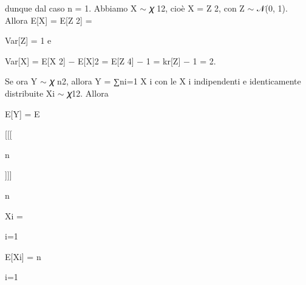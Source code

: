 \documentclass[a4paper,portrait,12pt]{article}
\begin{document}
\begin{flushleft}
dunque dal caso n = 1. Abbiamo X $\sim$ 𝜒 12, cio\`{e} X = Z 2, con Z $\sim$ 𝒩(0, 1). Allora E[X] = E[Z 2] =
\end{flushleft}


\begin{flushleft}
Var[Z] = 1 e
\end{flushleft}





\begin{flushleft}
Var[X] = E[X 2] $-$ E[X]2 = E[Z 4] $-$ 1 = kr[Z] $-$ 1 = 2.
\end{flushleft}


\begin{flushleft}
Se ora Y $\sim$ 𝜒 n2, allora Y = ∑ni=1 X i con le X i indipendenti e identicamente distribuite Xi $\sim$ 𝜒12. Allora
\end{flushleft}


\begin{flushleft}
E[Y] = E
\end{flushleft}





[[[





\begin{flushleft}
n
\end{flushleft}





]]]





\begin{flushleft}
n
\end{flushleft}





\begin{flushleft}
Xi =
\end{flushleft}


\begin{flushleft}
i=1
\end{flushleft}





\begin{flushleft}
E[Xi] = n
\end{flushleft}


\begin{flushleft}
i=1
\end{flushleft}
\end{document}
